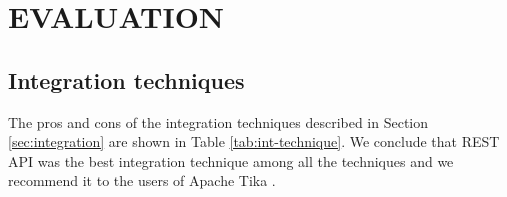 \section {EVALUATION} \label{sec:evaluation}

\subsection{Integration techniques}
The pros and cons of the integration techniques described in Section \ref{sec:integration} are shown in Table \ref{tab:int-technique}. We conclude that REST API was the best integration technique among all the techniques and we recommend it to the users of Apache Tika \cite{TikaAndVision}.

\newcommand{\tabItem}{\leavevmode\llap{\textbullet~}\raggedright}

